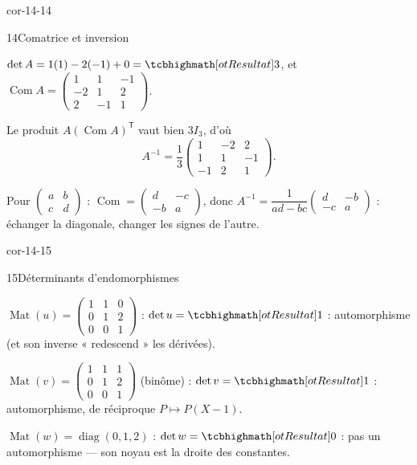 \begin{blocLivre}{cor-14-14}
\begin{corrige}{14}{Comatrice et inversion}
\begin{questions}
  \item $\det A=1(1)-2(-1)+0=\res{3}$, et
    $\operatorname{Com}A=\begin{pmatrix}1&1&-1\\-2&1&2\\2&-1&1\end{pmatrix}$.
  \item Le produit $A(\operatorname{Com}A)^{\mathsf T}$ vaut bien
    $3I_3$, d'où
    \[
    A^{-1}=\frac13\begin{pmatrix}1&-2&2\\1&1&-1\\-1&2&1\end{pmatrix}.
    \]
  \item Pour $\begin{pmatrix}a&b\\c&d\end{pmatrix}$ :
    $\operatorname{Com}=\begin{pmatrix}d&-c\\-b&a\end{pmatrix}$, donc
    $A^{-1}=\dfrac{1}{ad-bc}\begin{pmatrix}d&-b\\-c&a\end{pmatrix}$ :
    échanger la diagonale, changer les signes de l'autre.
\end{questions}
\end{corrige}
\end{blocLivre}

\begin{blocLivre}{cor-14-15}
\begin{corrige}{15}{Déterminants d'endomorphismes}
\begin{questions}
  \item $\operatorname{Mat}(u)=\begin{pmatrix}1&1&0\\0&1&2\\0&0&1\end{pmatrix}$ :
    $\det u=\res{1}$ : automorphisme (et son inverse « redescend » les
    dérivées).
  \item $\operatorname{Mat}(v)=\begin{pmatrix}1&1&1\\0&1&2\\0&0&1\end{pmatrix}$
    (binôme) : $\det v=\res{1}$ : automorphisme, de réciproque
    $P\mapsto P(X-1)$.
  \item $\operatorname{Mat}(w)=\operatorname{diag}(0,1,2)$ :
    $\det w=\res{0}$ : pas un automorphisme — son noyau est la droite des
    constantes.
\end{questions}
\end{corrige}
\end{blocLivre}

